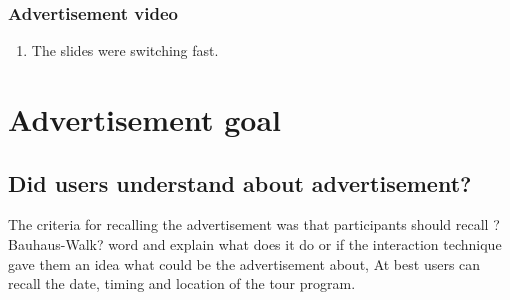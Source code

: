 \subsubsection{Advertisement video}
\begin{enumerate}
\item	The slides were switching fast.

\end{enumerate}


\section{Advertisement goal}

\subsection{Did users understand about advertisement?}

	The criteria for recalling the advertisement was that participants should recall ?Bauhaus-Walk? word and explain what does it do or if the interaction technique gave them an idea what could be the advertisement about, At best users can recall the date, timing and location of the tour program.



